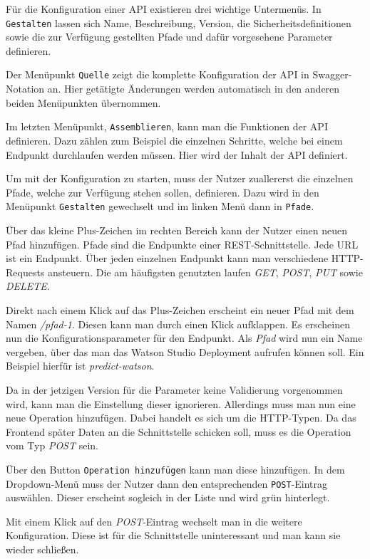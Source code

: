 Für die Konfiguration einer API existieren drei wichtige Untermenüs. In \texttt{Gestalten} lassen sich Name, Beschreibung,
Version, die Sicherheitsdefinitionen sowie die zur Verfügung gestellten Pfade und dafür vorgesehene Parameter definieren.

Der Menüpunkt \texttt{Quelle} zeigt die komplette Konfiguration der API in Swagger-Notation an. Hier getätigte Änderungen
werden automatisch in den anderen beiden Menüpunkten übernommen.

Im letzten Menüpunkt, \texttt{Assemblieren}, kann man die Funktionen der API definieren. Dazu zählen zum Beispiel die
einzelnen Schritte, welche bei einem Endpunkt durchlaufen werden müssen. Hier wird der Inhalt der API definiert.

Um mit der Konfiguration zu starten, muss der Nutzer zuallererst die einzelnen Pfade, welche zur Verfügung stehen
sollen, definieren. Dazu wird in den Menüpunkt \texttt{Gestalten} gewechselt und im linken Menü dann in \texttt{Pfade}.

Über das kleine Plus-Zeichen im rechten Bereich kann der Nutzer einen neuen Pfad hinzufügen. Pfade sind die Endpunkte
einer REST-Schnittstelle. Jede URL ist ein Endpunkt. Über jeden einzelnen Endpunkt kann man verschiedene HTTP-Requests
ansteuern. Die am häufigsten genutzten laufen \textit{GET}, \textit{POST}, \textit{PUT} sowie \textit{DELETE}.

Direkt nach einem Klick auf das Plus-Zeichen erscheint ein neuer Pfad mit dem Namen \textit{/pfad-1}. Diesen kann man
durch einen Klick aufklappen. Es erscheinen nun die Konfigurationsparameter für den Endpunkt. Als \textit{Pfad} wird nun
ein Name vergeben, über das man das Watson Studio Deployment aufrufen können soll. Ein Beispiel hierfür ist
\textit{predict-watson}.

Da in der jetzigen Version für die Parameter keine Validierung vorgenommen wird, kann man die Einstellung dieser
ignorieren. Allerdings muss man nun eine neue Operation hinzufügen. Dabei handelt es sich um die HTTP-Typen. Da das
Frontend später Daten an die Schnittstelle schicken soll, muss es die Operation vom Typ \textit{POST} sein.

Über den Button \texttt{Operation hinzufügen} kann man diese hinzufügen. In dem Dropdown-Menü muss der Nutzer dann den
entsprechenden \texttt{POST}-Eintrag auswählen. Dieser erscheint sogleich in der Liste und wird grün hinterlegt.

Mit einem Klick auf den \textit{POST}-Eintrag wechselt man in die weitere Konfiguration. Diese ist für die Schnittstelle
uninteressant und man kann sie wieder schließen.

